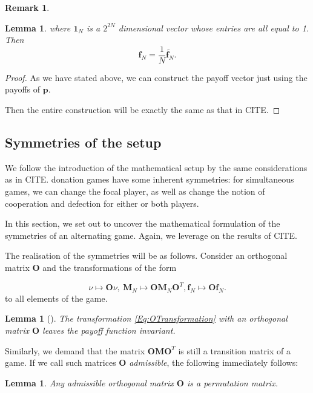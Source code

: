 \documentclass{article}
\def\p{\mathbf{p}}
\def\Mb{\mathbf{M}}
\newtheorem{lemma}[theorem]{Lemma}
\theoremstyle{definition}
\newtheorem{remark}[theorem]{Remark}
\numberwithin{equation}{section}
\begin{document}
\begin{remark}
\begin{lemma}
    where $\mathbf{1}_N$ is a $2^{2N}$ dimensional vector whose entries are all equal to 1. Then 
    \begin{equation}
        \mathbf{f}_N =\frac{1}{N}\widetilde{\mathbf{f}_N}.
    \end{equation}
\end{lemma}
\begin{proof}
    As we have stated above, we can construct the payoff vector just using the payoffs of $\p$.  

    Then the entire construction will be exactly the same as that in CITE. 
\end{proof}


\end{remark}

\subsection{Symmetries of the setup}
\label{sec:symmetries setup}
We follow the introduction of the mathematical setup by the same considerations as in CITE. donation games have some inherent symmetries: for simultaneous games, we can change the focal player, as well as change the notion of cooperation and defection for either or both players. 

In this section, we set out to uncover the mathematical formulation of the symmetries of an alternating game. Again, we leverage on the results of CITE. 


The realisation of the symmetries will be as follows. 
Consider an orthogonal matrix  $\mathbf{O}$  and the transformations of the form

\begin{equation} \label{Eq:OTransformation}
\nu\mapsto \mathbf{O}\nu, \ \mathbf{M}_N\mapsto \mathbf{O}\mathbf{M}_N\mathbf{O}^T, \mathbf{f}_N\mapsto \mathbf{O}\mathbf{f}_N.
\end{equation}
to all elements of the game. 
\begin{lemma}[\cite{balabanova2024adaptive}]
\label{st: lemma classification}
  The transformation \eqref{Eq:OTransformation} with an orthogonal matrix $\mathbf{O}$ leaves the payoff function invariant.
\end{lemma}
Similarly, we demand that the matrix $\mathbf{O}\Mb\mathbf{O}^T$ is still a transition matrix of a game. If we call such matrices $\mathbf{O}$ \textit{admissible}, the following immediately follows: 
\begin{lemma}
      Any admissible orthogonal matrix $\mathbf{O}$ is a permutation matrix. 
\end{lemma}
\end{document}
